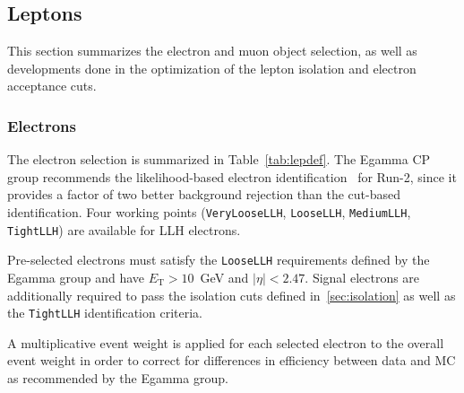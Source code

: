 

\subsection{Leptons}
\label{sec:objects_leptons}

This section summarizes the electron and muon object selection, as well as developments done in the optimization of the
lepton isolation and electron acceptance cuts.

\subsubsection{Electrons}
\label{sec:objects_electrons}

The electron selection is summarized in Table~\ref{tab:lepdef}. The Egamma CP group recommends the likelihood-based electron identification~\cite{ATLAS-CONF-2014-032} for Run-2, since it provides a factor of two better background rejection than the cut-based identification.
Four working points ({\tt VeryLooseLLH}, {\tt LooseLLH}, {\tt MediumLLH}, {\tt TightLLH}) are available for LLH electrons.

Pre-selected electrons must satisfy the {\tt LooseLLH} requirements defined by the Egamma group and have $E_\mathrm{T}>10$~GeV and $|\eta|<2.47$. Signal electrons are additionally required to pass the isolation cuts defined in~\ref{sec:isolation} as well as 
the {\tt TightLLH} identification criteria.

A multiplicative event weight is applied for each selected electron to the overall event weight in order to correct for differences in efficiency between data and MC as recommended by the Egamma group.

